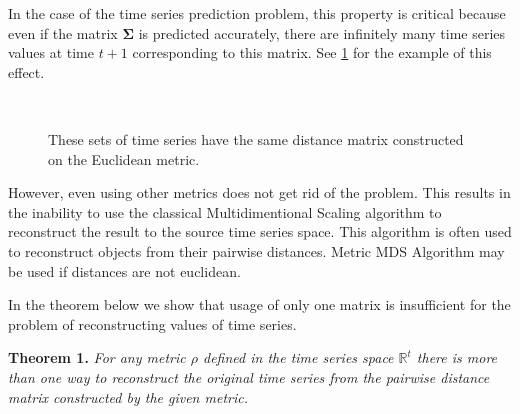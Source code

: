 \documentclass{article}
\begin{document}
In the case of the time series prediction problem, this property is critical because even if the matrix $\mathbf{\Sigma}$ is predicted accurately, there are infinitely many time series values at time $t+1$ corresponding to this matrix. See \ref{fig:fig1} for the example of this effect.
\begin{figure}[H]
	\centering
	\\
	\caption{These sets of time series have the same distance matrix constructed on the Euclidean metric.}
	\label{fig:fig1}
\end{figure}

However, even using other metrics does not get rid of the problem. This results in the inability to use the classical Multidimentional Scaling \cite{MDS} algorithm to reconstruct the result to the source time series space. This algorithm is often used to reconstruct objects from their pairwise distances. Metric MDS Algorithm  \cite{inbook} may be used if distances are not euclidean.

In the theorem below we show that usage of only one matrix is insufficient for the problem of reconstructing values of time series.

\textbf{Theorem 1.} \textit{For any metric $\rho$ defined in the time series space $\mathbb{R}^t$ there is more than one way to reconstruct the original time series from the pairwise distance matrix constructed by the given metric.}	
\end{document}
